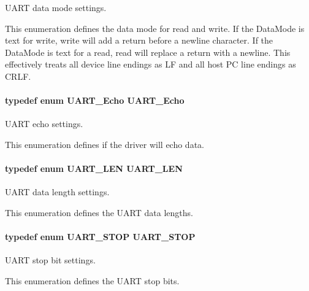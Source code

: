 U\-A\-R\-T data mode settings. 

This enumeration defines the data mode for read and write. If the Data\-Mode is text for write, write will add a return before a newline character. If the Data\-Mode is text for a read, read will replace a return with a newline. This effectively treats all device line endings as L\-F and all host P\-C line endings as C\-R\-L\-F. 
\paragraph[{U\-A\-R\-T\-\_\-\-Echo}]{\setlength{\rightskip}{0pt plus 5cm}typedef enum {\bf U\-A\-R\-T\-\_\-\-Echo}  {\bf U\-A\-R\-T\-\_\-\-Echo}}\label{_u_a_r_t_8h_a5372f2a3d7f68aa38ea560ed5fe520a9}


U\-A\-R\-T echo settings. 

This enumeration defines if the driver will echo data. 
\paragraph[{U\-A\-R\-T\-\_\-\-L\-E\-N}]{\setlength{\rightskip}{0pt plus 5cm}typedef enum {\bf U\-A\-R\-T\-\_\-\-L\-E\-N}  {\bf U\-A\-R\-T\-\_\-\-L\-E\-N}}\label{_u_a_r_t_8h_a9290f6d71215e218998106ddff83911b}


U\-A\-R\-T data length settings. 

This enumeration defines the U\-A\-R\-T data lengths. 
\paragraph[{U\-A\-R\-T\-\_\-\-S\-T\-O\-P}]{\setlength{\rightskip}{0pt plus 5cm}typedef enum {\bf U\-A\-R\-T\-\_\-\-S\-T\-O\-P}  {\bf U\-A\-R\-T\-\_\-\-S\-T\-O\-P}}\label{_u_a_r_t_8h_a7f2ba2e85c63055e158e5e4b51b1f9fd}


U\-A\-R\-T stop bit settings. 

This enumeration defines the U\-A\-R\-T stop bits. 
